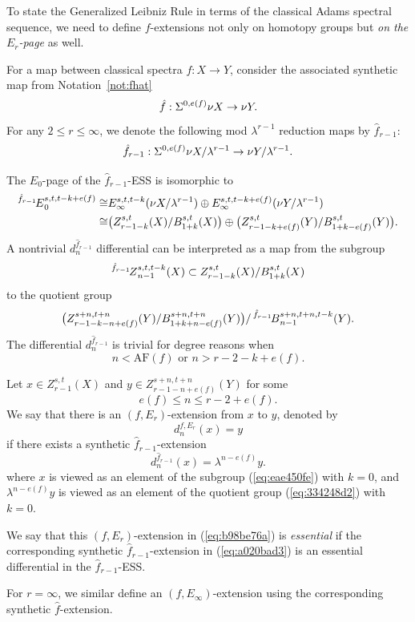 \documentclass{amsart}
\numberwithin{equation}{section}
\newcommand{\AF}{\mathrm{AF}}
\newcommand{\ESS}[1]{\prescript{#1\!}{}{E}}
\newcommand{\ZESS}[1]{\prescript{#1\!}{}{Z}}
\newcommand{\BESS}[1]{\prescript{#1\!}{}{B}}
\begin{document}
To state the Generalized Leibniz Rule in terms of the classical Adams spectral sequence, we need to define $f$-extensions not only on homotopy groups but \emph{on the $E_r$-page} as well.

\begin{notation}
For a map between classical spectra $f: X\to Y$, consider the associated synthetic map from Notation~\ref{not:fhat}
$$\hat f: \Sigma^{0,e(f)}\nu X\to \nu Y.$$
For any $2\le r\le \infty$, we denote the following mod $\lambda^{r-1}$ reduction maps by $\hat f_{r-1}$:
$$\hat f_{r-1}: \Sigma^{0,e(f)}\nu X/\lambda^{r-1}\to \nu Y/\lambda^{r-1}.$$
\end{notation}

The $E_0$-page of the $\hat f_{r-1}$-ESS is isomorphic to
$$\begin{aligned}
    \ESS{\hat f_{r-1}}_0^{s,t,t-k+e(f)}\iso & E_\infty^{s,t,t-k}(\nu X/\lambda^{r-1})\oplus E_\infty^{s,t,t-k+e(f)}(\nu Y/\lambda^{r-1})\\
    \iso & \big(Z_{r-1-k}^{s,t}(X)/B_{1+k}^{s,t}(X)\big)\oplus \big(Z_{r-1-k+e(f)}^{s,t}(Y)/B_{1+k-e(f)}^{s,t}(Y)\big).
\end{aligned}$$
A nontrivial $d^{\hat f_{r-1}}_n$ differential can be interpreted as a map from the subgroup
\begin{equation}\label{eq:eae450fe}
  \ZESS{\hat f_{r-1}}_{n-1}^{s,t,t-k}(X) \subset  Z_{r-1-k}^{s,t}(X)/B_{1+k}^{s,t}(X)
\end{equation}
to the quotient group 
\begin{equation}\label{eq:334248d2}
    \big(Z_{r-1-k-n+e(f)}^{s+n,t+n}(Y)/B_{1+k+n-e(f)}^{s+n,t+n}(Y) \big)/\BESS{\hat f_{r-1}}_{n-1}^{s+n,t+n,t-k}(Y).
\end{equation}
The differential $d^{\hat f_{r-1}}_n$ is trivial for degree reasons when 
$$n<\AF(f)\text{ or }n>r-2-k+e(f).$$

    
\begin{definition}\label{def:6c076a33}
    Let $x\in Z^{s,t}_{r-1}(X)$ and $y\in Z^{s+n,t+n}_{r-1-n+e(f)}(Y)$ for some 
    $$e(f)\le n\le r-2+e(f).$$
    We say that there is an $(f,E_r)$-extension from $x$ to $y$, denoted by
    \begin{equation}\label{eq:b98be76a}
    d_{n}^{f,E_r}(x)=y
    \end{equation}
    if there exists a synthetic $\hat f_{r-1}$-extension
    \begin{equation}\label{eq:a020bad3}
        d_{n}^{\hat f_{r-1}}(x)=\lambda^{n-e(f)} y.
    \end{equation}
    where $x$ is viewed as an element of the subgroup (\ref{eq:eae450fe}) with $k=0$, and $\lambda^{n-e(f)} y$ is viewed as an element of the quotient group (\ref{eq:334248d2}) with $k=0$. 

   We say that this $(f,E_r)$-extension in (\ref{eq:b98be76a}) is \emph{essential} if the corresponding synthetic $\hat f_{r-1}$-extension in (\ref{eq:a020bad3}) is an essential differential in the $\hat f_{r-1}$-ESS.
    
    For $r=\infty$, we similar define an $(f,E_\infty)$-extension using the corresponding synthetic $\hat f$-extension.
\end{definition}
\end{document}
